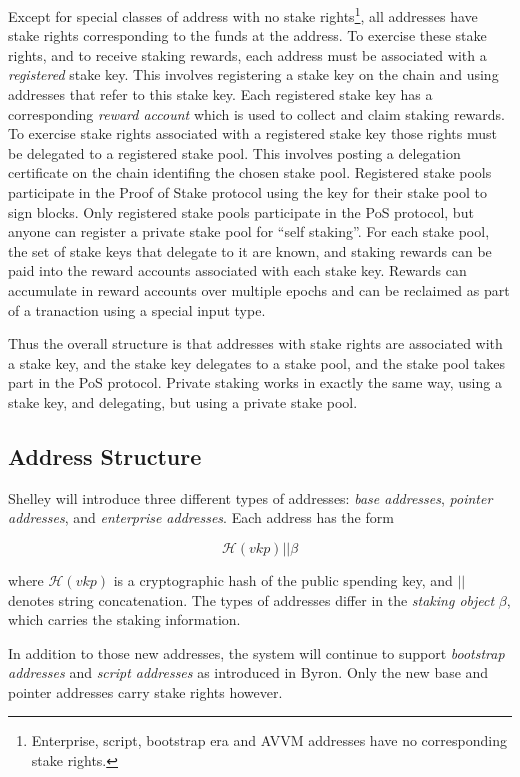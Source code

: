 \documentclass[11pt,a4paper]{article}
\begin{document}
Except for special classes of address with no stake rights\footnote{Enterprise,
  script, bootstrap era and AVVM addresses have no corresponding stake
  rights.}, all addresses have stake rights corresponding to the funds
at the address. To exercise these stake rights, and to receive staking
rewards, each address must be associated with a \emph{registered} stake
key. This involves registering a stake key on the chain and using
addresses that refer to this stake key. Each registered stake key has a
corresponding \emph{reward account} which is used to collect and claim
staking rewards. To exercise stake rights associated with a registered
stake key those rights must be delegated to a registered stake pool.
This involves posting a delegation certificate on the chain identifing
the chosen stake pool. Registered stake pools participate in the Proof
of Stake protocol using the key for their stake pool to sign blocks.
Only registered stake pools participate in the PoS protocol, but anyone
can register a private stake pool for ``self staking''. For each stake
pool, the set of stake keys that delegate to it are known, and staking
rewards can be paid into the reward accounts associated with each stake
key. Rewards can accumulate in reward accounts over multiple epochs and
can be reclaimed as part of a tranaction using a special input type.

Thus the overall structure is that addresses with stake rights are
associated with a stake key, and the stake key delegates to a stake
pool, and the stake pool takes part in the PoS protocol. Private staking
works in exactly the same way, using a stake key, and delegating, but
using a private stake pool.

\subsection{Address Structure}\label{address-structure}

Shelley will introduce three different types of addresses: \emph{base
addresses}, \emph{pointer addresses}, and \emph{enterprise addresses}.
Each address has the form

\[
\mathcal{H}({vkp}) || \beta
\]

where \(\mathcal{H}({vkp})\) is a cryptographic hash of the public
spending key, and \(||\) denotes string concatenation. The types of
addresses differ in the \emph{staking object} \(\beta\), which carries
the staking information.

In addition to those new addresses, the system will continue to support
\emph{bootstrap addresses} and \emph{script addresses} as introduced in
Byron. Only the new base and pointer addresses carry stake rights
however.
\end{document}
